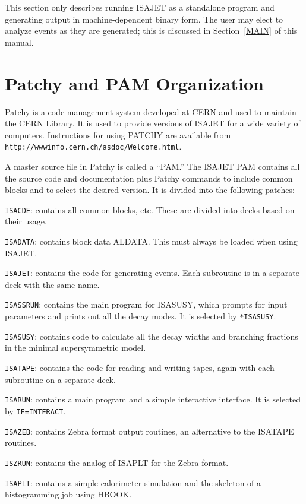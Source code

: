       This section only describes running ISAJET as a standalone
program and generating output in machine-dependent binary form. The
user may elect to analyze events as they are generated; this is
discussed in Section~\ref{MAIN} of this manual.
\newpage
\section{Patchy and PAM Organization\label{PATCHY}}

      Patchy is a code management system developed at CERN and used to
maintain the CERN Library. It is used to provide versions of ISAJET for
a wide variety of computers. Instructions for using PATCHY are
available from \verb|http://wwwinfo.cern.ch/asdoc/Welcome.html|.

      A master source file in Patchy is called a ``PAM.'' The ISAJET
PAM contains all the source code and documentation plus Patchy
commands to include common blocks and to select the desired version. It
is divided into the following patches: 

      \verb|ISACDE|: contains all common blocks, etc. These are divided
into decks based on their usage.

      \verb|ISADATA|: contains block data ALDATA. This must always be
loaded when using ISAJET.

      \verb|ISAJET|: contains the code for generating events. Each
subroutine is in a separate deck with the same name.

      \verb|ISASSRUN|: contains the main program for ISASUSY, which
prompts for input parameters and prints out all the decay modes. It is
selected by \verb|*ISASUSY|.

      \verb|ISASUSY|: contains code to calculate all the decay widths
and branching fractions in the minimal supersymmetric model.

      \verb|ISATAPE|: contains the code for reading and writing tapes,
again with each subroutine on a separate deck.

      \verb|ISARUN|: contains a main program and a simple interactive
interface.  It is selected by \verb|IF=INTERACT|.

      \verb|ISAZEB|: contains Zebra format output routines, an
alternative to the ISATAPE routines.

      \verb|ISZRUN|: contains the analog of ISAPLT for the Zebra
format. 

      \verb|ISAPLT|: contains a simple calorimeter simulation and the
skeleton of a histogramming job using HBOOK.

